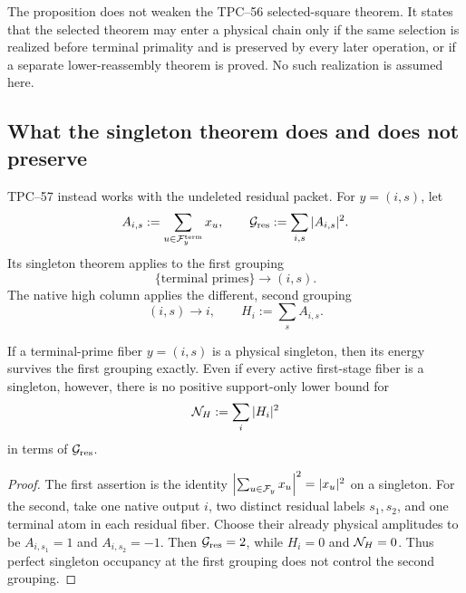 The proposition does not weaken the TPC--56 selected-square theorem.  It
states that the selected theorem may enter a physical chain only if the same
selection is realized before terminal primality and is preserved by every
later operation, or if a separate lower-reassembly theorem is proved.  No
such realization is assumed here.

\subsection{What the singleton theorem does and does not preserve}

TPC--57 instead works with the undeleted residual packet.  For
\(y=(i,s)\), let
\begin{equation}
 A_{i,s}:=\sum_{u\in\mathcal F_y^{\rm term}}x_u,
 \qquad
 \mathcal G_{\rm res}:=\sum_{i,s}|A_{i,s}|^2.
 \label{eq:tpc58-residual-grouped-energy}
\end{equation}
Its singleton theorem applies to the first grouping
\begin{equation}
 \{\text{terminal primes}\}\longrightarrow(i,s).
 \label{eq:tpc58-first-grouping}
\end{equation}
The native high column applies the different, second grouping
\begin{equation}
 (i,s)\longrightarrow i,
 \qquad
 H_i:=\sum_sA_{i,s}.
 \label{eq:tpc58-second-grouping}
\end{equation}

\begin{proposition}
\label{prop:tpc58-singleton-stops-at-residual}
If a terminal-prime fiber \(y=(i,s)\) is a physical singleton, then its
energy survives the first grouping exactly.  Even if every active first-stage
fiber is a singleton, however, there is no positive support-only lower bound
for
\begin{equation}
 \mathcal N_H:=\sum_i|H_i|^2
 \label{eq:tpc58-native-high-energy}
\end{equation}
in terms of \(\mathcal G_{\rm res}\).
\end{proposition}

\begin{proof}
The first assertion is the identity
\(\left|\sum_{u\in\mathcal F_y}x_u\right|^2=|x_u|^2\) on a singleton.  For the
second, take one native output \(i\), two distinct residual labels
\(s_1,s_2\), and one terminal atom in each residual fiber.  Choose their
already physical amplitudes to be
\(A_{i,s_1}=1\) and \(A_{i,s_2}=-1\).  Then
\(\mathcal G_{\rm res}=2\), while \(H_i=0\) and \(\mathcal N_H=0\).  Thus perfect
singleton occupancy at the first grouping does not control the second
grouping.
\end{proof}

